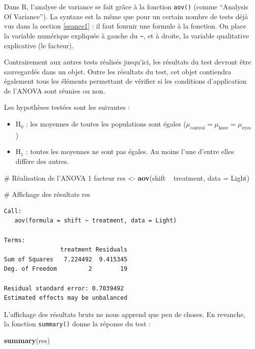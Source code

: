 \documentclass[a4paperpaper,]{article}
\newenvironment{Shaded}{\begin{snugshade}}{\end{snugshade}}
\newcommand{\CommentTok}[1]{\textcolor[rgb]{0.54,0.53,0.53}{#1}}
\newcommand{\DataTypeTok}[1]{\textcolor[rgb]{0.00,0.34,0.68}{#1}}
\newcommand{\KeywordTok}[1]{\textcolor[rgb]{0.12,0.11,0.11}{\textbf{#1}}}
\newcommand{\NormalTok}[1]{\textcolor[rgb]{0.12,0.11,0.11}{#1}}
\newcommand{\OperatorTok}[1]{\textcolor[rgb]{0.12,0.11,0.11}{#1}}
\newcommand{\StringTok}[1]{\textcolor[rgb]{0.75,0.01,0.01}{#1}}
\providecommand{\tightlist}{%
  \setlength{\itemsep}{0pt}\setlength{\parskip}{0pt}}
\begin{document}
Dans R, l'analyse de variance se fait grâce à la fonction \texttt{aov()} (comme ``Analysis Of Variance''). La syntaxe est la même que pour un certain nombre de tests déjà vus dans la section \ref{seance1} : il faut fournir une formule à la fonction. On place la variable numérique expliquée à gauche du \texttt{\textasciitilde{}}, et à droite, la variable qualitative explicative (le facteur).

Contrairement aux autres tests réalisés jusqu'ici, les résultats du test devront être sauvegardés dans un objet. Outre les résultats du test, cet objet contiendra également tous les éléments permettant de vérifier si les conditions d'application de l'ANOVA sont réunies ou non.

Les hypothèses testées sont les suivantes :

\begin{itemize}
\tightlist
\item
  H\(_0\) : les moyennes de toutes les populations sont égales (\(\mu_{\textrm{control}} = \mu_{\textrm{knee}} = \mu_{\textrm{eyes}}\))
\item
  H\(_1\) : toutes les moyennes ne sont pas égales. Au moins l'une d'entre elles diffère des autres.
\end{itemize}

\begin{Shaded}
\begin{Highlighting}[]
\CommentTok{# Réalisation de l'ANOVA 1 facteur}
\NormalTok{res <-}\StringTok{ }\KeywordTok{aov}\NormalTok{(shift }\OperatorTok{~}\StringTok{ }\NormalTok{treatment, }\DataTypeTok{data =}\NormalTok{ Light)}

\CommentTok{# Affichage des résultats}
\NormalTok{res}
\end{Highlighting}
\end{Shaded}

\begin{verbatim}
Call:
   aov(formula = shift ~ treatment, data = Light)

Terms:
                treatment Residuals
Sum of Squares   7.224492  9.415345
Deg. of Freedom         2        19

Residual standard error: 0.7039492
Estimated effects may be unbalanced
\end{verbatim}

L'affichage des résultats bruts ne nous apprend que peu de choses. En revanche, la fonction \texttt{summary()} donne la réponse du test :

\begin{Shaded}
\begin{Highlighting}[]
\KeywordTok{summary}\NormalTok{(res)}
\end{Highlighting}
\end{Shaded}
\end{document}

